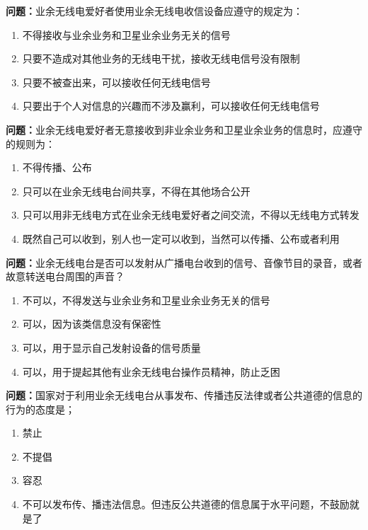 \noindent\textbf{问题：}业余无线电爱好者使用业余无线电收信设备应遵守的规定为：
\begin{enumerate}[label=\Alph*), leftmargin=3em]
\item 不得接收与业余业务和卫星业余业务无关的信号
\item 只要不造成对其他业务的无线电干扰，接收无线电信号没有限制
\item 只要不被查出来，可以接收任何无线电信号
\item 只要出于个人对信息的兴趣而不涉及赢利，可以接收任何无线电信号
\end{enumerate}

\bigskip


\noindent\textbf{问题：}业余无线电爱好者无意接收到非业余业务和卫星业余业务的信息时，应遵守的规则为：
\begin{enumerate}[label=\Alph*), leftmargin=3em]
\item 不得传播、公布
\item 只可以在业余无线电台间共享，不得在其他场合公开
\item 只可以用非无线电方式在业余无线电爱好者之间交流，不得以无线电方式转发
\item 既然自己可以收到，别人也一定可以收到，当然可以传播、公布或者利用
\end{enumerate}

\bigskip


\noindent\textbf{问题：}业余无线电台是否可以发射从广播电台收到的信号、音像节目的录音，或者故意转送电台周围的声音？
\begin{enumerate}[label=\Alph*), leftmargin=3em]
\item 不可以，不得发送与业余业务和卫星业余业务无关的信号
\item 可以，因为该类信息没有保密性
\item 可以，用于显示自己发射设备的信号质量
\item 可以，用于提起其他有业余无线电台操作员精神，防止乏困
\end{enumerate}

\bigskip


\noindent\textbf{问题：}国家对于利用业余无线电台从事发布、传播违反法律或者公共道德的信息的行为的态度是；
\begin{enumerate}[label=\Alph*), leftmargin=3em]
\item 禁止
\item 不提倡
\item 容忍
\item 不可以发布传、播违法信息。但违反公共道德的信息属于水平问题，不鼓励就是了
\end{enumerate}

